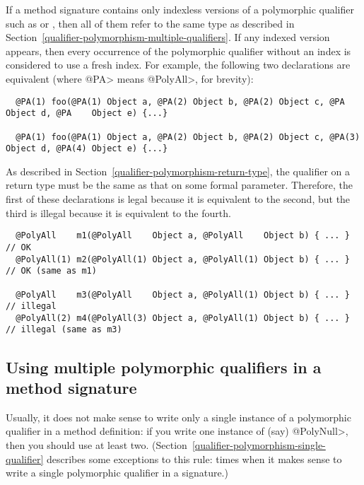 If a method signature contains only indexless versions of a polymorphic
qualifier such as  or
, then all of them refer to
the same type as described in
Section~\ref{qualifier-polymorphism-multiple-qualifiers}.  If any indexed
version appears, then every occurrence of the polymorphic qualifier without
an index is considered to use a fresh index.  For example, the following
two declarations are equivalent (where \<@PA> means \<@PolyAll>, for brevity):

\begin{smaller}
\begin{Verbatim}
  @PA(1) foo(@PA(1) Object a, @PA(2) Object b, @PA(2) Object c, @PA    Object d, @PA    Object e) {...}

  @PA(1) foo(@PA(1) Object a, @PA(2) Object b, @PA(2) Object c, @PA(3) Object d, @PA(4) Object e) {...}
\end{Verbatim}
\end{smaller}

As described in Section~\ref{qualifier-polymorphism-return-type}, the
qualifier on a return type must be the same as that on some formal parameter.
Therefore, the first of these declarations is legal because it is
equivalent to the second, but the third is illegal because it is
equivalent to the fourth.

\begin{Verbatim}
  @PolyAll    m1(@PolyAll    Object a, @PolyAll    Object b) { ... } // OK
  @PolyAll(1) m2(@PolyAll(1) Object a, @PolyAll(1) Object b) { ... } // OK (same as m1)

  @PolyAll    m3(@PolyAll    Object a, @PolyAll(1) Object b) { ... } // illegal
  @PolyAll(2) m4(@PolyAll(3) Object a, @PolyAll(1) Object b) { ... } // illegal (same as m3)
\end{Verbatim}


\subsection{Using multiple polymorphic qualifiers in a method signature\label{qualifier-polymorphism-multiple-qualifiers}}


Usually, it does not make sense to write only a single instance of a polymorphic
qualifier in a method definition:  if you write one instance of (say)
\<@PolyNull>, then you should use at least two.
(Section~\ref{qualifier-polymorphism-single-qualifier} describes some
exceptions to this rule:  times when it makes sense to write a single
polymorphic qualifier in a signature.)

